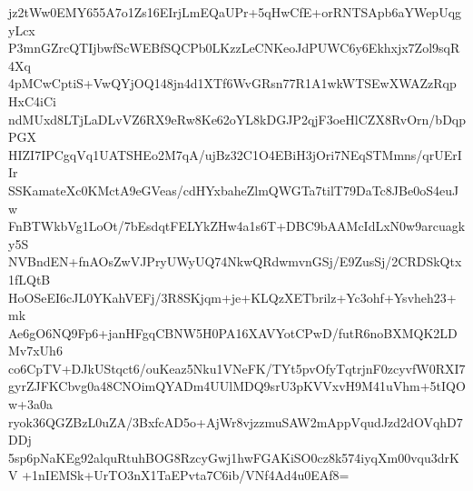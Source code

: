 jz2tWw0EMY655A7o1Zs16EIrjLmEQaUPr+5qHwCfE+orRNTSApb6aYWepUqgyLcx
P3mnGZrcQTIjbwfScWEBfSQCPb0LKzzLeCNKeoJdPUWC6y6Ekhxjx7Zol9sqR4Xq
4pMCwCptiS+VwQYjOQ148jn4d1XTf6WvGRsn77R1A1wkWTSEwXWAZzRqpHxC4iCi
ndMUxd8LTjLaDLvVZ6RX9eRw8Ke62oYL8kDGJP2qjF3oeHlCZX8RvOrn/bDqpPGX
HIZI7IPCgqVq1UATSHEo2M7qA/ujBz32C1O4EBiH3jOri7NEqSTMmns/qrUErIIr
SSKamateXc0KMctA9eGVeas/cdHYxbaheZlmQWGTa7tilT79DaTc8JBe0oS4euJw
FnBTWkbVg1LoOt/7bEsdqtFELYkZHw4a1s6T+DBC9bAAMcIdLxN0w9arcuagky5S
NVBndEN+fnAOsZwVJPryUWyUQ74NkwQRdwmvnGSj/E9ZusSj/2CRDSkQtx1fLQtB
HoOSeEI6cJL0YKahVEFj/3R8SKjqm+je+KLQzXETbrilz+Yc3ohf+Ysvheh23+mk
Ae6gO6NQ9Fp6+janHFgqCBNW5H0PA16XAVYotCPwD/futR6noBXMQK2LDMv7xUh6
co6CpTV+DJkUStqct6/ouKeaz5Nku1VNeFK/TYt5pvOfyTqtrjnF0zcyvfW0RXI7
gyrZJFKCbvg0a48CNOimQYADm4UUlMDQ9srU3pKVVxvH9M41uVhm+5tIQOw+3a0a
ryok36QGZBzL0uZA/3BxfcAD5o+AjWr8vjzzmuSAW2mAppVqudJzd2dOVqhD7DDj
5sp6pNaKEg92alquRtuhBOG8RzcyGwj1hwFGAKiSO0cz8k574iyqXm00vqu3drKV
+1nIEMSk+UrTO3nX1TaEPvta7C6ib/VNf4Ad4u0EAf8=
